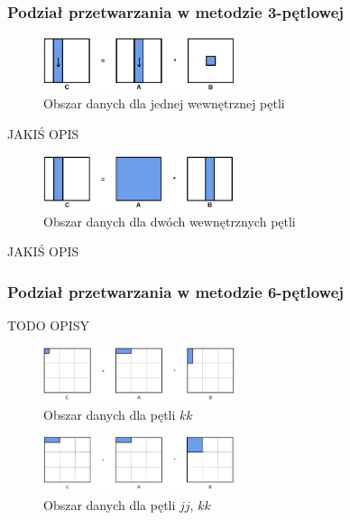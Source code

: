 \documentclass[10pt,a4paper]{article}
\begin{document}
\newpage

\subsubsection{Podział przetwarzania w metodzie 3-pętlowej}
\begin{figure}[h]
    \centering
    \includegraphics[width=0.5\textwidth]{3loops1.png}
    \caption{Obszar danych dla jednej wewnętrznej pętli}
\end{figure}

JAKIŚ OPIS

\begin{figure}[h]
    \centering
    \includegraphics[width=0.5\textwidth]{3loops2.png}
    \caption{Obszar danych dla dwóch wewnętrznych pętli}
\end{figure}
JAKIŚ OPIS

\newpage

\subsubsection{Podział przetwarzania w metodzie 6-pętlowej}
TODO OPISY

\begin{figure}[h]
    \centering
    \includegraphics[width=0.5\textwidth]{6loops1.png}
    \caption{Obszar danych dla pętli $kk$}
\end{figure}

\begin{figure}[h]
    \centering
    \includegraphics[width=0.5\textwidth]{6loops2.png}
    \caption{Obszar danych dla pętli $jj$, $kk$}
\end{figure}
\end{document}
